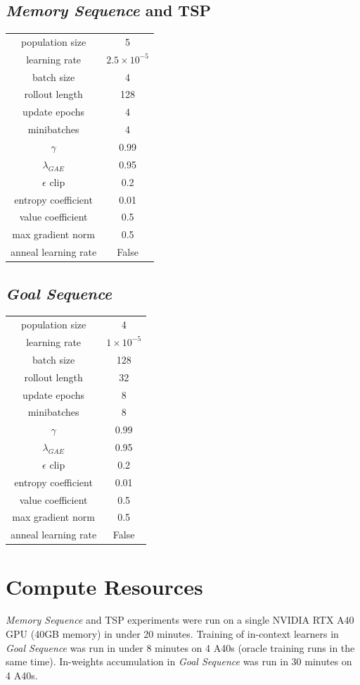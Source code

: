 \documentclass{article}
\begin{document}
\subsection{\textit{Memory Sequence} and TSP}
\begin{center}
\begin{tabular}{ c c }
 population size & 5 \\
 learning rate & $2.5 \times 10^{-5}$ \\
 batch size & 4 \\
 rollout length & 128 \\
 update epochs & 4 \\
 minibatches & 4 \\
 $\gamma$ & 0.99 \\
 $\lambda_{GAE}$ & 0.95 \\
 $\epsilon$ clip & 0.2 \\
 entropy coefficient & 0.01 \\
 value coefficient & 0.5 \\
 max gradient norm & 0.5 \\
 anneal learning rate & False
\end{tabular}
\end{center}
\subsection{\textit{Goal Sequence}}
\begin{center}
\begin{tabular}{ c c }
 population size & 4 \\
 learning rate & $1 \times 10^{-5}$ \\
 batch size & 128 \\
 rollout length & 32 \\
 update epochs & 8 \\
 minibatches & 8 \\
 $\gamma$ & 0.99 \\
 $\lambda_{GAE}$ & 0.95 \\
 $\epsilon$ clip & 0.2 \\
 entropy coefficient & 0.01 \\
 value coefficient & 0.5 \\
 max gradient norm & 0.5 \\
 anneal learning rate & False
\end{tabular}
\end{center}
\newpage
\section{Compute Resources}
\label{A:compute}
\textit{Memory Sequence} and TSP experiments were run on a single NVIDIA RTX A40 GPU (40GB memory) in under 20 minutes. Training of in-context learners in \textit{Goal Sequence} was run in under 8 minutes on 4 A40s (oracle training runs in the same time). In-weights accumulation in \textit{Goal Sequence} was run in 30 minutes on 4 A40s.
\end{document}
